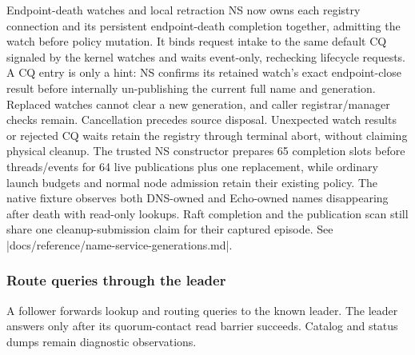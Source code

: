 \begin{implementationdetail}{Endpoint-death watches and local retraction}
NS now owns each registry connection and
its persistent endpoint-death completion together, admitting the watch before
policy mutation. It binds request intake to the same default CQ signaled by
the kernel watches and waits event-only, rechecking lifecycle requests. A CQ
entry is only a hint: NS confirms its retained watch's exact endpoint-close
result before internally un-publishing the current full name and generation.
Replaced watches cannot clear a new generation, and caller registrar/manager
checks remain. Cancellation precedes source disposal. Unexpected watch results
or rejected CQ waits retain the registry through terminal abort, without
claiming physical cleanup. The trusted NS constructor prepares 65 completion
slots before threads/events for 64 live publications plus one replacement, while
ordinary launch budgets and normal node admission retain their existing policy.
The native fixture observes both DNS-owned and Echo-owned names disappearing
after death with read-only lookups. Raft completion and the publication scan
still share one cleanup-submission claim for their captured episode. See
\repofile|docs/reference/name-service-generations.md|.
\end{implementationdetail}

\subsubsection{Route queries through the leader}

A follower forwards lookup and routing queries to the known leader. The leader
answers only after its quorum-contact read barrier succeeds. Catalog and status
dumps remain diagnostic observations.

